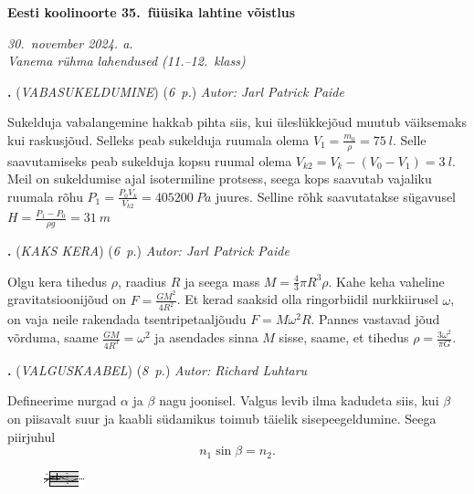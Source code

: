 \documentclass[11pt,a5paper]{article}
\newcommand{\numb}[1]{\vspace{5pt}\textbf{\large #1}}
\newcommand{\nimi}[1]{(\textsl{\small #1})}
\newcommand{\punktid}[1]{(\emph{#1~p.})}
\newcounter{ylesanne}
\newcommand{\yl}[1]{\addtocounter{ylesanne}{1}\numb{\theylesanne.} \nimi{#1} \newblock{}}
\newcommand{\autor}[1]{\emph{ Autor: #1}}%
\begin{document}
\begin{center}
  \textbf{\Large Eesti koolinoorte 35.\ füüsika lahtine võistlus} \par
  \emph{30.\ november 2024. a.\\Vanema rühma lahendused (11.--12.\ klass)}
\end{center}

\DeclareSIUnit{}

\yl{VABASUKELDUMINE}
\punktid{6} \autor{Jarl Patrick Paide}

Sukelduja vabalangemine hakkab pihta siis, kui üleslükkejõud muutub väiksemaks kui raskusjõud. Selleks peab sukelduja ruumala olema $V_1 = \frac{m_0}{\rho} = \SI{75}{l}$. Selle saavutamiseks peab sukelduja kopsu ruumal olema $V_{k2} = V_{k} - (V_0 - V_1) = \SI{3}{l}$. Meil on sukeldumise ajal isotermiline protsess, seega kops saavutab vajaliku ruumala rõhu $P_1 = \frac{P_0V_{k}}{V_{k2}} = \SI{405200}{Pa}$ juures. Selline rõhk saavutatakse sügavusel $H = \frac{P_1 - P_0}{\rho g} = \SI{31}{m}$

\yl{KAKS KERA}
\punktid{6} \autor{Jarl Patrick Paide}

Olgu kera tihedus $\rho$, raadius $R$ ja seega mass $M = \frac{4}{3}\pi R^3 \rho$. Kahe keha vaheline gravitatsioonijõud on $F = \frac{G M^2}{4R^2}$. Et kerad saaksid olla ringorbiidil nurkkiirusel $\omega$, on vaja neile rakendada tsentripetaaljõudu $F = M \omega^2 R$. Pannes vastavad jõud võrduma, saame $\frac{G M}{4 R^3} = \omega^2$ ja asendades sinna $M$ sisse, saame, et tihedus $\rho = \frac{3\omega^2}{\pi G}$.

\yl{VALGUSKAABEL}
\punktid{8} \autor{Richard Luhtaru}

Defineerime nurgad $\alpha$ ja $\beta$ nagu joonisel. Valgus levib ilma kadudeta siis, kui $\beta$ on piisavalt suur ja kaabli südamikus toimub täielik sisepeegeldumine. Seega piirjuhul
\begin{equation*}
    n_1 \sin \beta = n_2.
\end{equation*}

\begin{figure}[h]
    \centering
    \includegraphics[width=.7\linewidth]{valguskaabel_lah_joonis.pdf}
\end{figure}
\end{document}
